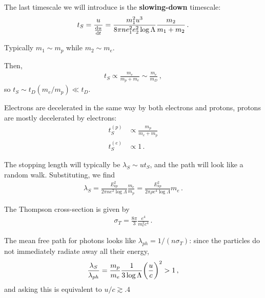 \documentclass[main.tex]{subfiles}
\begin{document}
The last timescale we will introduce is the \textbf{slowing-down} timescale: 
%
\begin{align}
t_S = \frac{u}{\dv{u}{t}} = \frac{m_1^2u^3}{8 \pi n e_1^2 e_2^2 \log \Lambda } \frac{m_2}{m_1 + m_2 }
\,.
\end{align}

Typically \(m_1 \sim m_p\) while \(m_2 \sim m_e\). 

Then, 
%
\begin{align}
t_S \propto \frac{m_e}{m_p + m_e} \sim \frac{m_e}{m_D} 
\,,
\end{align}
%
so \(t_S \sim t_D (m_e / m_p) \ll t_D\). 

Electrons are decelerated in the same way by both electrons and protons, protons are mostly decelerated by electrons: 
%
\begin{align}
t_S^{(p)} &\propto \frac{m_p}{m_e + m_p} \\
t_S^{(e)} &\propto 1
\,.
\end{align}

The stopping length will typically be \(\lambda _S \sim u t_S\), and the path will look like a random walk. Substituting, we find 
%
\begin{align}
\lambda _S = \frac{E_{kp}^2}{2 \pi n e^2 \log \Lambda } \frac{m_e}{m_p} = \frac{E^2_{kp}}{2 \pi \rho e^{4} \log \Lambda } m_e
\,.
\end{align}

The Thompson cross-section is given by 
%
\begin{align}
\sigma _T = \frac{8 \pi }{3} \frac{e^{4}}{m_e^2 c^{4}}
\,.
\end{align}

The mean free path for photons looks like \(\lambda _{ph} = 1/ (n \sigma _T)\): since the particles do not immediately radiate away all their energy, 
%
\begin{align}
\frac{\lambda_S}{\lambda_{ph}} = \frac{m_p}{m_e} \frac{1}{3 \log \Lambda } \qty( \frac{u}{c})^2 > 1
\,,
\end{align}
%
and asking this is equivalent to \(u/c \gtrsim \num{.4}\)
\end{document}
